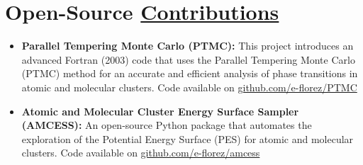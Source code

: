 \section{Open-Source \href{.}{Contributions}}

\begin{itemize}
    \small
    \item \textbf{Parallel Tempering Monte Carlo (PTMC):}
          This project introduces an advanced Fortran (2003) code that uses the Parallel Tempering Monte Carlo (PTMC) method for an accurate and efficient analysis of phase transitions in atomic and molecular clusters. Code available on \href{https://github.com/e-florez/PTMC}{github.com/e-florez/PTMC}

    \item \textbf{Atomic and Molecular Cluster Energy Surface Sampler (AMCESS):}
          An open-source Python package that automates the exploration of the Potential Energy Surface (PES) for atomic and molecular clusters. %
          Code available on \href{https://github.com/e-florez/amcess}{github.com/e-florez/amcess}


\end{itemize}